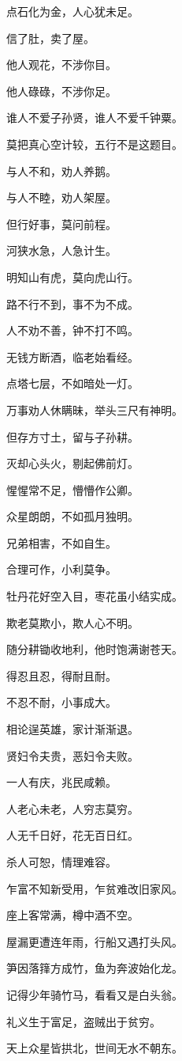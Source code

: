 \documentclass[12pt,oneside]{book}
\begin{document}
点石化为金，人心犹未足。

信了肚，卖了屋。

他人观花，不涉你目。

他人碌碌，不涉你足。

谁人不爱子孙贤，谁人不爱千钟粟。

莫把真心空计较，五行不是这题目。

与人不和，劝人养鹅。

与人不睦，劝人架屋。

但行好事，莫问前程。

河狭水急，人急计生。

明知山有虎，莫向虎山行。

路不行不到，事不为不成。

人不劝不善，钟不打不鸣。

无钱方断酒，临老始看经。

点塔七层，不如暗处一灯。

万事劝人休瞒昧，举头三尺有神明。

但存方寸土，留与子孙耕。

灭却心头火，剔起佛前灯。

惺惺常不足，懵懵作公卿。

众星朗朗，不如孤月独明。

兄弟相害，不如自生。

合理可作，小利莫争。

牡丹花好空入目，枣花虽小结实成。

欺老莫欺小，欺人心不明。

随分耕锄收地利，他时饱满谢苍天。

得忍且忍，得耐且耐。

不忍不耐，小事成大。

相论逞英雄，家计渐渐退。

贤妇令夫贵，恶妇令夫败。

一人有庆，兆民咸赖。

人老心未老，人穷志莫穷。

人无千日好，花无百日红。

杀人可恕，情理难容。

乍富不知新受用，乍贫难改旧家风。

座上客常满，樽中酒不空。

屋漏更遭连年雨，行船又遇打头风。

笋因落箨方成竹，鱼为奔波始化龙。

记得少年骑竹马，看看又是白头翁。

礼义生于富足，盗贼出于贫穷。

天上众星皆拱北，世间无水不朝东。
\end{document}
